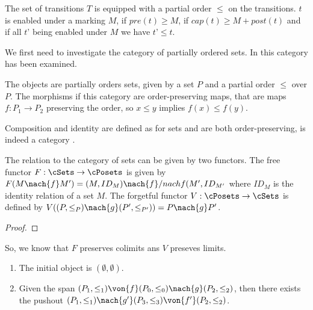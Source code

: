 The set of transitions $T$ is equipped with a partial order $\le$ on the transitions. $t$ is enabled under a marking $M$, if $pre(t) \ge M$, if $cap(t) \ge M+post(t)$ and if 
 all $t’$ being enabled under $M$ we have $t’\le t$.

We first need to investigate the category \cPosets of partially ordered sets. In \cite{Cod07} this category has been examined.

\begin{definition}
   The objects are partially orders sets, given by a set $P$ and a partial order $\le$ over $P$.
	 The morphisms if this category are order-preserving maps, that are maps $f:P_1 \to P_2$  preserving the order, so $x\le y$ implies $f(x) \le f(y)$.
\end{definition}
Composition  and identity are defined as for sets and are both order-preserving,  \cPosets is indeed a category \cite{Cod07}.

The relation to the category of sets can be given by two functors.
The free functor  $F:\cSets \to \cPosets$ is given by $F(M\nach{f}M')= (M,ID_M) \nach{f} /nach{f} (M',ID_{M'}$ where $ID_M$ is the identity relation of a set $M$.
The forgetful functor $V: \cPosets \to \cSets$ is defined by $V( (P,\le_P) \nach{g} (P',\le_{P'})) = P \nach{g} P'$.

\begin{lemma}

\end{lemma}

\begin{proof}
\end{proof}
So, we know that $F$ preserves  colimits ans $V$ preseves limits.


\begin{lemma}
\label{l.poPosets}
\begin{enumerate}
	\item The initial object is $(\emptyset,\emptyset)$.
	\item Given the span $(P_1,\le_1) \von{f} (P_0,\le_0) \nach{g} (P_2,\le_2)$, then there exists  the pushout
	     $(P_1,\le_1) \nach{g'} (P_3,\le_3) \von{f'} (P_2,\le_2)$.
\end{enumerate}
\end{lemma}

